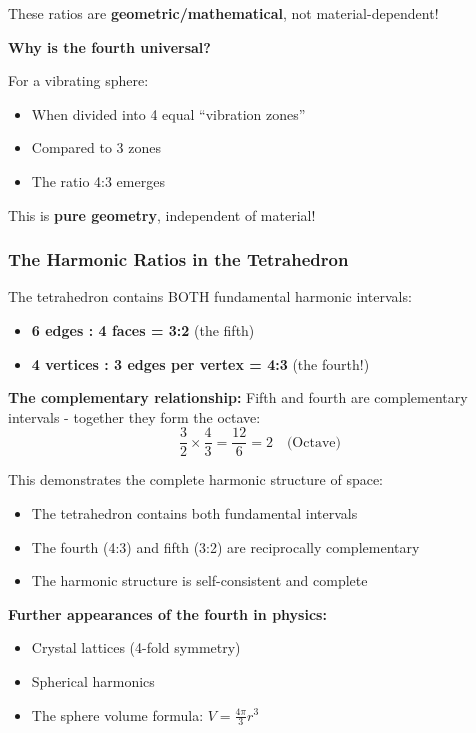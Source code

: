 	These ratios are \textbf{geometric/mathematical}, not material-dependent!
	
	\textbf{Why is the fourth universal?}
	
	For a vibrating sphere:
	\begin{itemize}
		\item When divided into 4 equal ``vibration zones''
		\item Compared to 3 zones
		\item The ratio 4:3 emerges
	\end{itemize}
	
	This is \textbf{pure geometry}, independent of material!
	
	\subsubsection{The Harmonic Ratios in the Tetrahedron}
	\label{subsubsec:tetrahedron_harmonics}
	
	The tetrahedron contains BOTH fundamental harmonic intervals:
	\begin{itemize}
		\item \textbf{6 edges : 4 faces = 3:2} (the fifth)
		\item \textbf{4 vertices : 3 edges per vertex = 4:3} (the fourth!)
	\end{itemize}
	
	\textbf{The complementary relationship:}
	Fifth and fourth are complementary intervals - together they form the octave:
	\begin{equation}
		\frac{3}{2} \times \frac{4}{3} = \frac{12}{6} = 2 \quad \text{(Octave)}
	\end{equation}
	
	This demonstrates the complete harmonic structure of space:
	\begin{itemize}
		\item The tetrahedron contains both fundamental intervals
		\item The fourth (4:3) and fifth (3:2) are reciprocally complementary
		\item The harmonic structure is self-consistent and complete
	\end{itemize}
	
	\textbf{Further appearances of the fourth in physics:}
	\begin{itemize}
		\item Crystal lattices (4-fold symmetry)
		\item Spherical harmonics
		\item The sphere volume formula: $V = \frac{4\pi}{3}r^3$
	\end{itemize}
	

